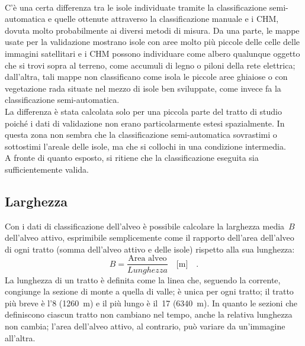 %
\\
C'è una certa differenza tra le isole individuate tramite la classificazione semi-automatica e quelle ottenute attraverso la classificazione manuale e i CHM, dovuta molto probabilmente ai diversi metodi di misura.
Da una parte, le mappe usate per la validazione mostrano isole con aree molto più piccole delle celle delle immagini satellitari e i CHM possono individuare come albero qualunque oggetto che si trovi sopra al terreno, come accumuli di legno o piloni della rete elettrica; dall'altra, tali mappe non classificano come isola le piccole aree ghiaiose o con vegetazione rada situate nel mezzo di isole ben sviluppate, come invece fa la classificazione semi-automatica.
\\
La differenza è stata calcolata solo per una piccola parte del tratto di studio poiché i dati di validazione non erano particolarmente estesi spazialmente.
In questa zona non sembra che la classificazione semi-automatica sovrastimi o sottostimi l'areale delle isole, ma che si collochi in una condizione intermedia.
\\
A fronte di quanto esposto, si ritiene che la classificazione eseguita sia sufficientemente valida.


\subsection{Larghezza}
Con i dati di classificazione dell'alveo è possibile calcolare la larghezza media~$B$ dell'alveo attivo, esprimibile semplicemente come il rapporto dell'area dell'alveo di ogni tratto (somma dell'alveo attivo e delle isole) rispetto alla sua lunghezza:
%
\begin{equation}
	\label{eq:larghezza-tratto}
	B = \frac{\text{Area alveo}}{Lunghezza} 
	\quad 
	\si{[\m]}
	\quad.
\end{equation}
% 
La lunghezza di un tratto è definita come la linea che,  seguendo la corrente, congiunge la sezione di monte a quella di valle; è unica per ogni tratto; il tratto più breve è l'8 (\SI{1260}{\m}) e il più lungo è il~17 (\SI{6340}{\m}).
In quanto le sezioni che definiscono ciascun tratto non cambiano nel tempo, anche la relativa lunghezza non cambia; l'area dell'alveo attivo, al contrario, può variare da un'immagine all'altra. 
%
%
